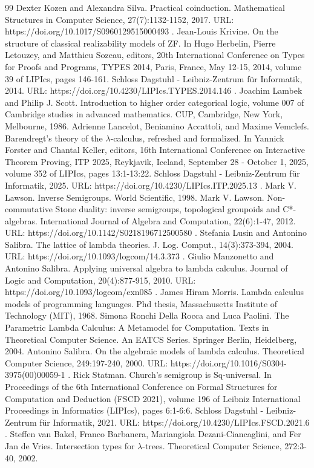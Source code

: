 \begin{thebibliography}{99}
 Dexter Kozen and Alexandra Silva. Practical coinduction. Mathematical Structures in Computer Science, 27(7):1132-1152, 2017. URL: https://doi.org/10.1017/S0960129515000493 .
 Jean-Louis Krivine. On the structure of classical realizability models of ZF. In Hugo Herbelin, Pierre Letouzey, and Matthieu Sozeau, editors, 20th International Conference on Types for Proofs and Programs, TYPES 2014, Paris, France, May 12-15, 2014, volume 39 of LIPIcs, pages 146-161. Schloss Dagstuhl - Leibniz-Zentrum für Informatik, 2014. URL: https://doi.org/10.4230/LIPIcs.TYPES.2014.146 .
 Joachim Lambek and Philip J. Scott. Introduction to higher order categorical logic, volume 007 of Cambridge studies in advanced mathematics. CUP, Cambridge, New York, Melbourne, 1986.
 Adrienne Lancelot, Beniamino Accattoli, and Maxime Vemclefs. Barendregt’s theory of the \ensuremath{\lambda}-calculus, refreshed and formalized. In Yannick Forster and Chantal Keller, editors, 16th International Conference on Interactive Theorem Proving, ITP 2025, Reykjavik, Iceland, September 28 - October 1, 2025, volume 352 of LIPIcs, pages 13:1-13:22. Schloss Dagstuhl - Leibniz-Zentrum für Informatik, 2025. URL: https://doi.org/10.4230/LIPIcs.ITP.2025.13 .
 Mark V. Lawson. Inverse Semigroups. World Scientific, 1998.
 Mark V. Lawson. Non-commutative Stone duality: inverse semigroups, topological groupoids and C*-algebras. International Journal of Algebra and Computation, 22(6):1-47, 2012. URL: https://doi.org/10.1142/S0218196712500580 .
 Stefania Lusin and Antonino Salibra. The lattice of lambda theories. J. Log. Comput., 14(3):373-394, 2004. URL: https://doi.org/10.1093/logcom/14.3.373 .
 Giulio Manzonetto and Antonino Salibra. Applying universal algebra to lambda calculus. Journal of Logic and Computation, 20(4):877-915, 2010. URL: https://doi.org/10.1093/logcom/exn085 .
 James Hiram Morris. Lambda calculus models of programming languages. Phd thesis, Massachusetts Institute of Technology (MIT), 1968.
 Simona Ronchi Della Rocca and Luca Paolini. The Parametric Lambda Calculus: A Metamodel for Computation. Texts in Theoretical Computer Science. An EATCS Series. Springer Berlin, Heidelberg, 2004.
 Antonino Salibra. On the algebraic models of lambda calculus. Theoretical Computer Science, 249:197-240, 2000. URL: https://doi.org/10.1016/S0304-3975(00)00059-1 .
 Rick Statman. Church’s semigroup is Sq-universal. In Proceedings of the 6th International Conference on Formal Structures for Computation and Deduction (FSCD 2021), volume 196 of Leibniz International Proceedings in Informatics (LIPIcs), pages 6:1-6:6. Schloss Dagstuhl - Leibniz-Zentrum für Informatik, 2021. URL: https://doi.org/10.4230/LIPIcs.FSCD.2021.6 .
 Steffen van Bakel, Franco Barbanera, Mariangiola Dezani-Ciancaglini, and Fer Jan de Vries. Intersection types for \ensuremath{\lambda}-trees. Theoretical Computer Science, 272:3-40, 2002.
\end{thebibliography}
